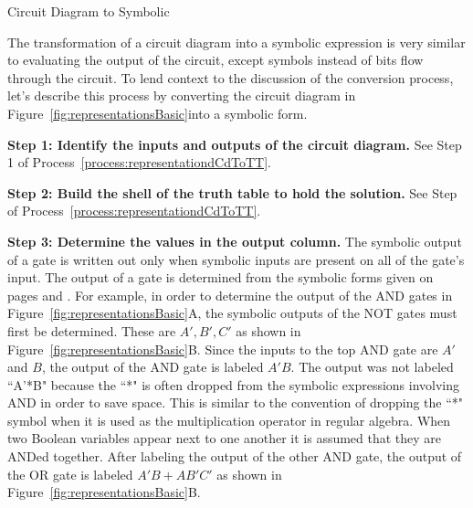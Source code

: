 \begin{process}{Circuit Diagram to Symbolic}
\label{process:representationdCdToSym}

The transformation of a circuit diagram into a symbolic expression 
is very similar to evaluating the output of the circuit, except symbols
instead of bits flow through the circuit.  To lend context to the discussion 
of the conversion process, let's describe this process by converting the 
circuit diagram in Figure~\ref{fig:representationsBasic}into a symbolic form.

\textbf{Step 1:  Identify the inputs and outputs of the circuit diagram.}
See Step 1 of Process~\ref{process:representationdCdToTT}.

\textbf{Step 2: Build the shell of the truth table to hold the solution. }
See Step of Process~\ref{process:representationdCdToTT}.


\textbf{Step 3: Determine the values in the output column. }
The symbolic output of a gate is written out only when symbolic inputs 
are present on all of the 
gate's input.  The output of a gate is determined from the symbolic forms
given on pages \pageref{page:elf1} and \pageref{page:elf2}.  
For example, in 
order to determine the output of the AND gates in Figure~\ref{fig:representationsBasic}A, the
symbolic outputs of the NOT gates must first be determined.  These are
$A', B', C'$ as shown in Figure~\ref{fig:representationsBasic}B.
Since the inputs to the top AND gate are $A'$ and $B$, the output of the AND
gate is labeled $A'B$.  The output was not labeled ``A'*B" because the
``*" is often dropped from the symbolic expressions involving AND 
in order to save space.  This is similar to the convention 
of dropping the ``*" symbol when it is used
as the multiplication operator in regular algebra.  When two Boolean 
variables appear next to one another it is assumed that they are ANDed together.
After labeling the output of the other AND gate, the output of the OR gate 
is labeled $A'B + AB'C'$ as shown in Figure~\ref{fig:representationsBasic}B.

{\setlength{\fboxsep}{0pt}
\centering  
{}
\par}\vspace{0.2cm}



\end{process}

